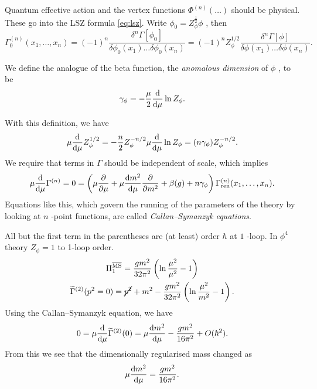 Quantum effective action and the vertex functions $\Phi^{(n)}( \dots)$ should be physical.
These go into the LSZ formula \eqref{eq:lsz}.
Write $\phi_0 = Z_\phi^{\frac{1}{2}} \phi$ , then
\begin{equation}
  \Gamma^{(n)}_{0} (x_1, \dots, x_n) = (-1)^n \frac{\delta^{n} \Gamma[\phi_0]}{\delta \phi_0 (x_1) \dots \delta\phi_0(x_n)} = (-1)^n Z_{\phi}^{1/ 2} \frac{\delta^n \Gamma[\phi]}{\delta \phi(x_1) \dots \delta \phi(x_n)}.
\end{equation}
\begin{definition}
  We define the analogue of the beta function, the \emph{anomalous dimension} of $\phi$ , to be
  \begin{equation}
    \gamma_\phi = -\frac{\mu}{2} \dv{\mu} \ln Z_\phi.
  \end{equation}
\end{definition}
With this definition, we have
\begin{equation}
  \mu \dv{\mu} Z_\phi^{1 / 2} = -\frac{n}{2} Z_\phi^{-n / 2} \mu \dv{\mu} \ln Z_\phi = (n \gamma_\phi) Z_\phi^{-n / 2}.
\end{equation}
We require that terms in $\Gamma$ should be independent of scale, which implies
\begin{equation}
  \mu \dv{\mu} \Gamma^{(n)} = 0 = \left( \mu \pdv{\mu} + \mu \dv{m^2}{\mu} \frac{\partial }{\partial m^2} + \beta(g) + n \gamma_\phi \right) \Gamma^{(n)}_{\text{ren}} (x_1, \dots, x_n).
\end{equation}
Equations like this, which govern the running of the parameters of the theory by looking at $n$ -point functions, are called \emph{Callan--Symanzyk equations}.

All but the first term in the parentheses are (at least) order $\hbar$  at $1$ -loop.
In $\phi^4$  theory $Z_\phi = 1$ to 1-loop order. 
\begin{gather}
  \Pi_1^{\overline{\text{MS}}{}} = \frac{g m^2}{32 \pi^2} \left( \ln \frac{\mu^2}{\mu^2} - 1 \right) \\
  \widetilde{\Gamma}^{(2)} (p^2 = 0) = \cancel{p^2} + m^2 - \frac{g m^2}{32 \pi^2} \left( \ln \frac{\mu^2}{m^2} - 1 \right).
\end{gather}
Using the Callan--Symanzyk equation, we have
\begin{equation}
  0 = \mu \dv{\mu} \widetilde{\Gamma}^{(2)}(0) = \mu \dv{m^2}{\mu} - \frac{g m^2}{16 \pi^2} + O(\hbar^2).
\end{equation}
From this we see that the dimensionally regularised mass changed as 
\begin{equation}
  \mu \dv{m^2}{\mu} = \frac{g m^2}{16 \pi^2}.
\end{equation}

